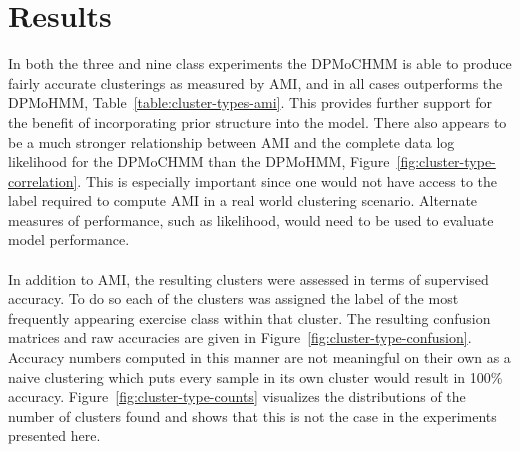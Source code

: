 \documentclass[12pt]{report}
\newcommand{\1}[0]{\mathbbm{1}}
\begin{document}
\section{Results}
In both the three and nine class experiments the \ac{DPMoCHMM}
is able to produce fairly accurate clusterings as measured by
\ac{AMI}, and in all cases outperforms the \ac{DPMoHMM}, Table~\ref{table:cluster-types-ami}.
This provides further support for the benefit of incorporating prior
structure into the model. There also appears to be a much stronger
relationship between \ac{AMI} and the complete data log likelihood for the
\ac{DPMoCHMM} than the \ac{DPMoHMM}, Figure~\ref{fig:cluster-type-correlation}.
This is especially important since one would not have access to the label required
to compute \ac{AMI} in a real world clustering scenario. Alternate measures of performance,
such as likelihood, would need to be used to evaluate model performance.
\\\\
In addition to \ac{AMI}, the resulting clusters were assessed in terms of
supervised accuracy.
To do so each of the clusters was assigned the label of the most
frequently appearing exercise class within that cluster.
The resulting confusion matrices and raw accuracies are given in Figure~\ref{fig:cluster-type-confusion}.
Accuracy numbers computed in this manner are not meaningful on their own as a
naive clustering which puts every sample in its own cluster would result in 100\% accuracy.
Figure~\ref{fig:cluster-type-counts} visualizes the distributions of the number of
clusters found and shows that this is not the case in the experiments presented here.
\end{document}
